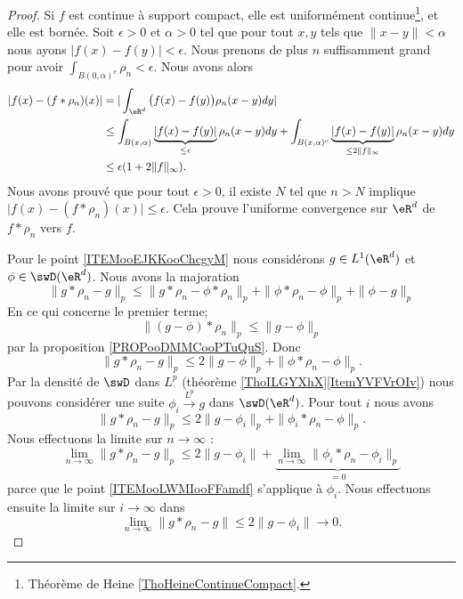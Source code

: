 \begin{proof}
    Si \( f\) est continue à support compact, elle est uniformément continue\footnote{Théorème de Heine \ref{ThoHeineContinueCompact}.}, et elle est bornée. Soit \( \epsilon>0\) et \( \alpha>0\) tel que pour tout \( x,y\) tels que \( \| x-y \|<\alpha\) nous ayons \( | f(x)-f(y) |<\epsilon\). Nous prenons de plus \(n\) suffisamment grand pour avoir \( \int_{B(0,\alpha)^c}\rho_n<\epsilon\). Nous avons alors
    \begin{subequations}
        \begin{align}
            | f(x)-(f*\rho_n)(x) |&=| \int_{\eR^d}\big( f(x)-f(y) \big)\rho_n(x-y)dy |\\
            &\leq \int_{B(x,\alpha)}\underbrace{| f(x)-f(y) |}_{\leq \epsilon}\rho_n(x-y)dy+\int_{B(x,\alpha)^c}\underbrace{| f(x)-f(y) |}_{\leq 2\| f \|_{\infty}}\rho_n(x-y)dy\\
            &\leq \epsilon(1+2\| f \|_{\infty}).
        \end{align}
    \end{subequations}
    Nous avons prouvé que pour tout \( \epsilon>0\), il existe \( N\) tel que \( n>N\) implique \( \big| f(x)-(f*\rho_n)(x) \big|\leq \epsilon\). Cela prouve l'uniforme convergence sur \( \eR^d\) de \( f*\rho_n\) vers \( f\).

    Pour le point \ref{ITEMooEJKKooChcgyM} nous considérons \( g\in L^1(\eR^d)\) et \( \phi\in \swD(\eR^d)\). Nous avons la majoration
    \begin{equation}
        \| g*\rho_n-g \|_p\leq \| g*\rho_n-\phi*\rho_n \|_p+\| \phi*\rho_n-\phi \|_p+\| \phi-g \|_p
    \end{equation}
    En ce qui concerne le premier terme;
    \begin{equation}
        \| (g-\phi)*\rho_n \|_p\leq \| g-\phi \|_p
    \end{equation}
    par la proposition \ref{PROPooDMMCooPTuQuS}. Donc
    \begin{equation}
        \| g*\rho_n-g \|_p\leq 2\| g-\phi \|_p+\| \phi*\rho_n-\phi \|_p.
    \end{equation}
    Par la densité de \( \swD\) dans \( L^p\) (théorème \ref{ThoILGYXhX}\ref{ItemYVFVrOIv}) nous pouvons considérer une suite \( \phi_i\stackrel{L^p}{\longrightarrow}g\) dans \( \swD(\eR^d)\). Pour tout \( i\) nous avons
    \begin{equation}
        \| g*\rho_n-g \|_p\leq 2\| g-\phi_i \|_p+\| \phi_i*\rho_n-\phi \|_p.
    \end{equation}
    Nous effectuons la limite sur \( n\to \infty\) :
    \begin{equation}
        \lim_{n\to \infty} \| g*\rho_n-g \|_p\leq 2\| g-\phi_i \|+\underbrace{\lim_{n\to \infty} \| \phi_i*\rho_n-\phi_i \|_p}_{=0}
    \end{equation}
    parce que le point \ref{ITEMooLWMIooFFamdf} s'applique à \( \phi_i\). Nous effectuons ensuite la limite sur \( i\to \infty\) dans
    \begin{equation}
        \lim_{n\to \infty} \| g*\rho_n-g \|\leq 2\| g-\phi_i \|\to 0.
    \end{equation}
\end{proof}

